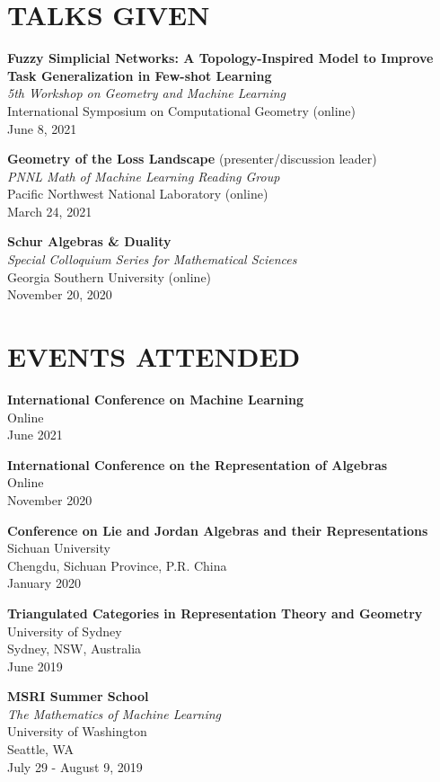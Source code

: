 \documentclass[margin]{res} %
\begin{document}
\begin{resume}
\section{TALKS GIVEN}

\textbf{Fuzzy Simplicial Networks: A Topology-Inspired Model to Improve Task Generalization in Few-shot Learning}\\
\textit{5th Workshop on Geometry and Machine Learning}\\
International Symposium on Computational Geometry (online)\\
June 8, 2021

\textbf{Geometry of the Loss Landscape} (presenter/discussion leader)\\
\textit{PNNL Math of Machine Learning Reading Group}\\
Pacific Northwest National Laboratory (online)\\
March 24, 2021

\textbf{Schur Algebras \& Duality}\\
\textit{Special Colloquium Series for Mathematical Sciences}\\
Georgia Southern University (online)\\
November 20, 2020

\section{\bf EVENTS ATTENDED}

\textbf{International Conference on Machine Learning}\\
Online\\
June 2021

\textbf{International Conference on the Representation of Algebras}\\
Online\\
November 2020

{\bf Conference on Lie and Jordan Algebras and their Representations}\\
Sichuan University\\
Chengdu, Sichuan Province, P.R. China\\
January 2020

{\bf Triangulated Categories in Representation Theory and Geometry}\\
University of Sydney\\
Sydney, NSW, Australia\\
June 2019

{\bf MSRI Summer School}\\
{\sl The Mathematics of Machine Learning}\\
University of Washington\\
Seattle, WA\\
July 29 - August 9, 2019


\end{resume}
\end{document}
